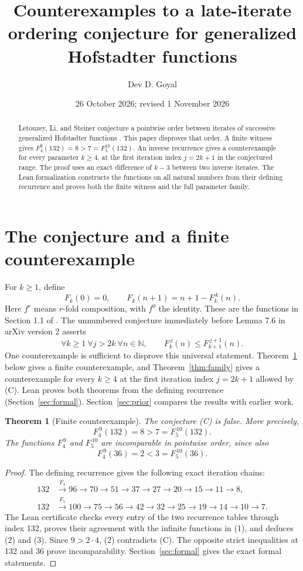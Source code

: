 \documentclass[11pt,a4paper]{article}
\title{Counterexamples to a late-iterate ordering conjecture for generalized Hofstadter functions}
\author{Dev D. Goyal}
\date{26 October 2026; revised 1 November 2026}
\newtheorem{theorem}{Theorem}
\newcommand{\N}{\mathbb N}
\newcommand{\itf}[2]{F_{#1}^{\,#2}}
\begin{document}
\maketitle
\begin{abstract}
Letouzey, Li, and Steiner conjecture a pointwise order between iterates
of successive generalized Hofstadter functions \cite{LLS}. This paper
disproves that order. A finite witness gives $F_4^9(132)=8>7=F_5^{10}(132)$.
An inverse recurrence gives a counterexample for every parameter $k\geq4$,
at the first iteration index $j=2k+1$ in the conjectured range.
The proof uses an exact difference of $k-3$ between two inverse iterates.
The Lean formalization constructs the functions on all natural numbers
from their defining recurrence and proves both the finite witness and
the full parameter family.
\end{abstract}
\section{The conjecture and a finite counterexample}

For \(k\ge1\), define
\[
 F_k(0)=0,\qquad F_k(n+1)=n+1-\itf{k}{k}(n).
 \tag{1}
\]
Here \(f^r\) means \(r\)-fold composition, with \(f^0\) the identity.
These are the functions in Section 1.1 of \cite{LLS}.
The unnumbered conjecture immediately before Lemma 7.6 in arXiv version 2
asserts
\[
 \forall k\ge1\ \forall j>2k\ \forall n\in\N,
 \qquad \itf{k}{j}(n)\le\itf{k+1}{j+1}(n).
 \tag{C}
\]
One counterexample is sufficient to disprove this universal statement.
Theorem~\ref{thm:finite} below gives a finite counterexample, and
Theorem~\ref{thm:family} gives a counterexample for every $k\geq4$ at the
first iteration index $j=2k+1$ allowed by \textup{(C)}. Lean proves both
theorems from the defining recurrence (Section~\ref{sec:formal}).
Section~\ref{sec:prior} compares the results with earlier work.

\begin{theorem}[Finite counterexample]\label{thm:finite}
The conjecture \textup{(C)} is false. More precisely,
\[
 \boxed{\itf{4}{9}(132)=8>7=\itf{5}{10}(132).}
 \tag{2}
\]
The functions \(\itf{4}{9}\) and \(\itf{5}{10}\) are incomparable in pointwise
order, since also
\[
 \itf{4}{9}(36)=2<3=\itf{5}{10}(36).
 \tag{3}
\]
\end{theorem}

\begin{proof}
The defining recurrence gives the following exact iteration chains:
\begin{align*}
132&\xrightarrow{F_4}96\to70\to51\to37\to27\to20\to15\to11\to8,\\
132&\xrightarrow{F_5}100\to75\to56\to42\to32\to25\to19\to14\to10\to7.
\end{align*}
The Lean certificate checks every entry of the two recurrence tables through
index 132, proves their agreement with the infinite functions in (1), and
deduces (2) and (3). Since \(9>2\cdot4\), (2) contradicts (C).
The opposite strict inequalities at 132 and 36 prove incomparability.
Section~\ref{sec:formal} gives the exact formal statements.
\end{proof}
\end{document}
